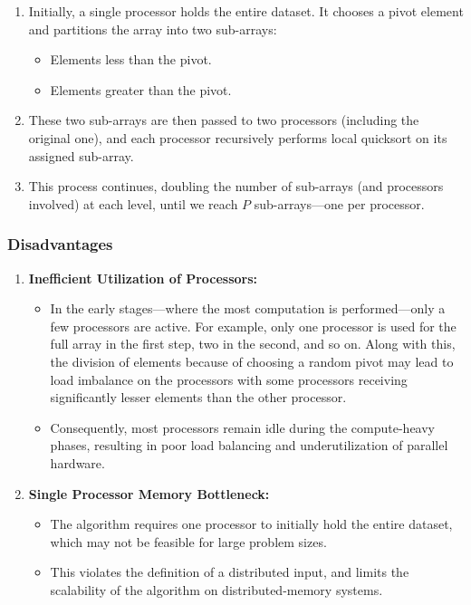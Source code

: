 \documentclass[12pt]{book}
\begin{document}
\begin{enumerate}
    \item Initially, a single processor holds the entire dataset. It chooses a pivot element and partitions the array into two sub-arrays:
    \begin{itemize}
        \item Elements less than the pivot.
        \item Elements greater than the pivot.
    \end{itemize}
    
    \item These two sub-arrays are then passed to two processors (including the original one), and each processor recursively performs local quicksort on its assigned sub-array.

    \item This process continues, doubling the number of sub-arrays (and processors involved) at each level, until we reach $P$ sub-arrays—one per processor.
\end{enumerate}

\subsubsection*{Disadvantages}

\begin{enumerate}
    \item \textbf{Inefficient Utilization of Processors:} 
    \begin{itemize}
        \item In the early stages—where the most computation is performed—only a few processors are active. For example, only one processor is used for the full array in the first step, two in the second, and so on. Along with this, the division of elements because of choosing a random pivot may lead to load imbalance on the processors with some processors receiving significantly lesser elements than the other processor.
        \item Consequently, most processors remain idle during the compute-heavy phases, resulting in poor load balancing and underutilization of parallel hardware.
    \end{itemize}

    \item \textbf{Single Processor Memory Bottleneck:}
    \begin{itemize}
        \item The algorithm requires one processor to initially hold the entire dataset, which may not be feasible for large problem sizes.
        \item This violates the definition of a distributed input, and limits the scalability of the algorithm on distributed-memory systems.
    \end{itemize}
\end{enumerate}
\end{document}
